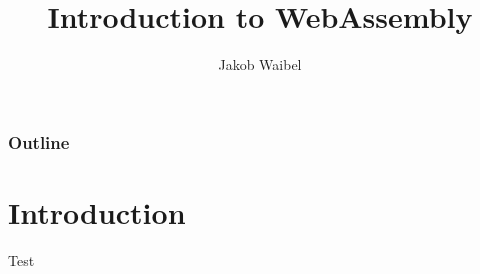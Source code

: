 \documentclass{beamer}
\title[WebAssembly]{Introduction to WebAssembly}
\author{Jakob Waibel}
\institute[Jakob Waibel]{Medieninformatik}
\date
\begin{document}
\begin{frame}
\titlepage
\end{frame}

\begin{frame}
\frametitle{Outline}
\tableofcontents
\end{frame}

\section{Introduction}
\begin{frame}{Test}

\end{frame}
\end{document}
